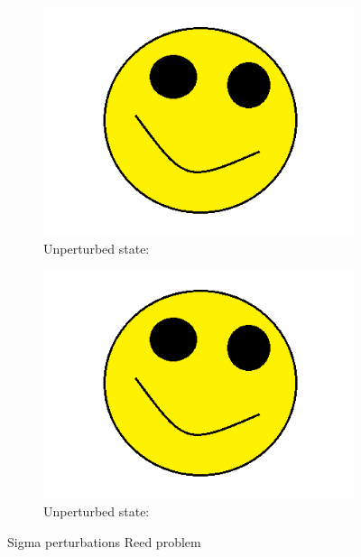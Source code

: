 \documentclass[12pt]{report}
\begin{document}
\begin{figure}[H]
\begin{subfigure}{.5\textwidth}
  \includegraphics[width=.98\linewidth]{figures/holder.png}
  \caption{Unperturbed state:}
  \label{fig:sfig3}
\end{subfigure}%
\begin{subfigure}{.5\textwidth}
  \centering
  \includegraphics[width=.98\linewidth]{figures/holder.png}
  \caption{Unperturbed state:}
  \label{fig:sfig6}
\end{subfigure}%
\caption{Sigma perturbations Reed problem}
\label{fig:fig}
\end{figure}
\end{document}
